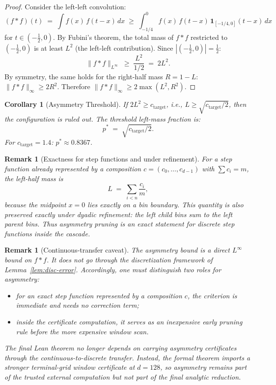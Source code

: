 \documentclass[11pt, letterpaper]{article}
\theoremstyle{paperplain}
\newtheorem{corollary}[theorem]{Corollary}
\theoremstyle{paperdef}
\newtheorem{remark}[theorem]{Remark}
\begin{document}
\begin{proof}
Consider the left-left convolution:
\[
  (f * f)(t) \;=\; \int f(x)\, f(t-x)\, dx
  \;\ge\; \int_{-1/4}^{0} f(x)\, f(t-x)\, \mathbf{1}_{[-1/4,0]}(t-x)\, dx
\]
for $t \in (-\tfrac12, 0)$.  By Fubini's theorem, the total mass of
$f * f$ restricted to $(-\tfrac12, 0)$ is at least $L^2$ (the
left-left contribution).  Since $|(-\tfrac12, 0)| = \tfrac12$:
\[
  \|f * f\|_{L^\infty} \;\ge\; \frac{L^2}{1/2} \;=\; 2L^2.
\]
By symmetry, the same holds for the right-half mass $R = 1 - L$:
$\|f*f\|_\infty \ge 2R^2$.  Therefore
$\|f*f\|_\infty \ge 2 \max(L^2, R^2)$.
\end{proof}

\begin{corollary}[Asymmetry Threshold]
\label{cor:asym-threshold}
If $2L^2 \ge c_{\mathrm{target}}$, i.e.,
$L \ge \sqrt{c_{\mathrm{target}}/2}$, then the configuration is
ruled out.  The threshold left-mass fraction is:
\[
  p^* \;=\; \sqrt{c_{\mathrm{target}} / 2}.
\]
For $c_{\mathrm{target}} = 1.4$: $p^* \approx 0.8367$.
\end{corollary}

\begin{remark}[Exactness for step functions and under refinement]
For a step function already represented by a composition
$c = (c_0,\ldots,c_{d-1})$ with $\sum c_i = m$, the left-half mass is
\[
  L \;=\; \sum_{i < n} \frac{c_i}{m},
\]
because the midpoint $x = 0$ lies exactly on a bin boundary.  This
quantity is also preserved exactly under dyadic refinement: the left
child bins sum to the left parent bins.  Thus asymmetry pruning is an
exact statement for discrete step functions inside the cascade.
\end{remark}

\begin{remark}[Continuous-transfer caveat]
The asymmetry bound is a \emph{direct} $L^\infty$ bound on $f * f$.
It does \emph{not} go through the discretization framework of
Lemma~\ref{lem:disc-error}.  Accordingly, one must distinguish two
roles for asymmetry:
\begin{itemize}
  \item for an \emph{exact step function} represented by a composition
    $c$, the criterion is immediate and needs no correction term;
  \item inside the certificate computation, it serves as an
    inexpensive early pruning rule before the more expensive
    window scan.
\end{itemize}
The final Lean theorem no longer depends on carrying asymmetry
certificates through the continuous-to-discrete transfer.  Instead, the
formal theorem imports a stronger terminal-grid window certificate at
$d = 128$, so asymmetry remains part of the trusted external
computation but not part of the final analytic reduction.
\end{remark}
\end{document}
